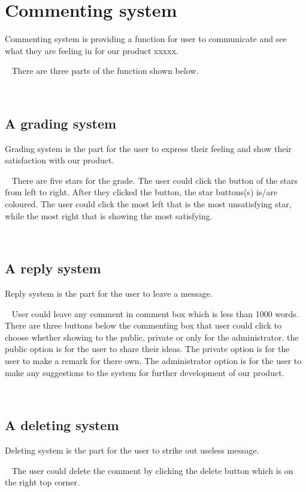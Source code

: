 \chapter{Commenting system}
Commenting system is providing a function for user to communicate and see what they are feeling in for our product xxxxx.\par~
There are three parts of the function shown below.\par~
\section{A grading system}
Grading system is the part for the user to express their feeling and show their satisfaction with our product.\par~
There are five stars for the grade. The user could click the button of the stars from left to right. After they clicked the button, the star buttons(s) is/are coloured. The user could click the most left that is the most unsatisfying star, while the most right that is showing the most satisfying.\par~
\section{A reply system}
Reply system is the part for the user to leave a message.\par~
User could leave any comment in comment box which is less than 1000 words. There are three buttons below the commenting box that user could click to choose whether showing to the public, private or only for the administrator. the public option is for the user to share their ideas. The private option is for the user to make a remark for there own. The administrator option is for the user to make any suggestions to the system for further development of our product.\par~
\section{A deleting system}
Deleting system is the part for the user to strike out useless message.\par~
The user could delete the comment by clicking the delete button which is on the right top corner.\par~
